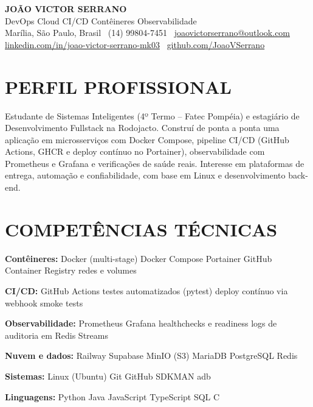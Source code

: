 \documentclass[9pt,a4paper]{extarticle}
\newcommand{\skill}[2]{\noindent\textbf{#1} #2\par}
\begin{document}
\begin{center}
  {\bfseries\color{navy}\fontsize{19}{22}\selectfont JOÃO VICTOR SERRANO}\\[2pt]
  {\color{gray}\fontsize{10}{12}\selectfont DevOps \textperiodcentered{} Cloud \textperiodcentered{} CI/CD \textperiodcentered{} Contêineres \textperiodcentered{} Observabilidade}\\[3pt]
  {\color{gray}\fontsize{8.6}{10.5}\selectfont Marília, São Paulo, Brasil \textbar\ (14) 99804-7451 \textbar\ \href{mailto:joaovictorserrano@outlook.com}{joaovictorserrano@outlook.com}\\
  \href{https://www.linkedin.com/in/joao-victor-serrano-mk03}{linkedin.com/in/joao-victor-serrano-mk03} \textbar\ \href{https://github.com/JoaoVSerrano}{github.com/JoaoVSerrano}}
\end{center}
\section*{PERFIL PROFISSIONAL}
Estudante de Sistemas Inteligentes (4º Termo – Fatec Pompéia) e estagiário de Desenvolvimento Fullstack na Rodojacto. Construí de ponta a ponta uma aplicação em microsserviços com Docker Compose, pipeline CI/CD (GitHub Actions, GHCR e deploy contínuo no Portainer), observabilidade com Prometheus e Grafana e verificações de saúde reais. Interesse em plataformas de entrega, automação e confiabilidade, com base em Linux e desenvolvimento back-end.

\section*{COMPETÊNCIAS TÉCNICAS}
\skill{Contêineres:}{Docker (multi-stage) \textperiodcentered{} Docker Compose \textperiodcentered{} Portainer \textperiodcentered{} GitHub Container Registry \textperiodcentered{} redes e volumes}
\skill{CI/CD:}{GitHub Actions \textperiodcentered{} testes automatizados (pytest) \textperiodcentered{} deploy contínuo via webhook \textperiodcentered{} smoke tests}
\skill{Observabilidade:}{Prometheus \textperiodcentered{} Grafana \textperiodcentered{} healthchecks e readiness \textperiodcentered{} logs de auditoria em Redis Streams}
\skill{Nuvem e dados:}{Railway \textperiodcentered{} Supabase \textperiodcentered{} MinIO (S3) \textperiodcentered{} MariaDB \textperiodcentered{} PostgreSQL \textperiodcentered{} Redis}
\skill{Sistemas:}{Linux (Ubuntu) \textperiodcentered{} Git \textperiodcentered{} GitHub \textperiodcentered{} SDKMAN \textperiodcentered{} adb}
\skill{Linguagens:}{Python \textperiodcentered{} Java \textperiodcentered{} JavaScript \textperiodcentered{} TypeScript \textperiodcentered{} SQL \textperiodcentered{} C}
\end{document}
